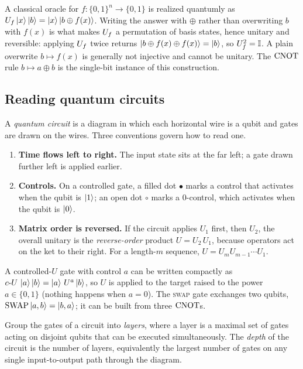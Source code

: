 \begin{remark}
A classical oracle for $f:\{0,1\}^{n}\to\{0,1\}$ is realized quantumly as
$U_{f}\ket{x}\ket{b}=\ket{x}\ket{b\oplus f(x)}$. Writing the answer with $\oplus$ rather
than overwriting $b$ with $f(x)$ is what makes $U_{f}$ a permutation of basis states,
hence unitary and reversible: applying $U_{f}$ twice returns $\ket{b\oplus f(x)\oplus f(x)}=\ket{b}$,
so $U_{f}^{2}=\mathbb{I}$. A plain overwrite $b\mapsto f(x)$ is generally not injective and
cannot be unitary. The $\mathrm{CNOT}$ rule $b\mapsto a\oplus b$ is the single-bit instance
of this construction.
\end{remark}

\subsection{Reading quantum circuits}

A \emph{quantum circuit} is a diagram in which each horizontal wire is a qubit and
gates are drawn on the wires. Three conventions govern how to read one.
\begin{enumerate}[label=(\arabic*)]
  \item \textbf{Time flows left to right.} The input state sits at the far left; a
        gate drawn further left is applied earlier.
  \item \textbf{Controls.} On a controlled gate, a filled dot $\bullet$ marks a
        control that activates when the qubit is $\ket{1}$; an open dot $\circ$
        marks a $0$-control, which activates when the qubit is $\ket{0}$.
  \item \textbf{Matrix order is reversed.} If the circuit applies $U_{1}$ first, then
        $U_{2}$, the overall unitary is the \emph{reverse-order} product $U=U_{2}\,U_{1}$,
        because operators act on the ket to their right. For a length-$m$ sequence,
        $U=U_{m}U_{m-1}\cdots U_{1}$.
\end{enumerate}

A controlled-$U$ gate with control $a$ can be written compactly as
$c\text{-}U\,\ket{a}\ket{b}=\ket{a}\,U^{a}\ket{b}$, so $U$ is applied to the target
raised to the power $a\in\{0,1\}$ (nothing happens when $a=0$). The \textsc{swap}
gate exchanges two qubits, $\mathrm{SWAP}\ket{a,b}=\ket{b,a}$; it can be built from
three $\mathrm{CNOT}$s.

\begin{definition}\label{def:lec01-depth}
Group the gates of a circuit into \emph{layers}, where a layer is a maximal set of
gates acting on disjoint qubits that can be executed simultaneously. The \emph{depth}
of the circuit is the number of layers, equivalently the largest number of gates on
any single input-to-output path through the diagram.
\end{definition}

